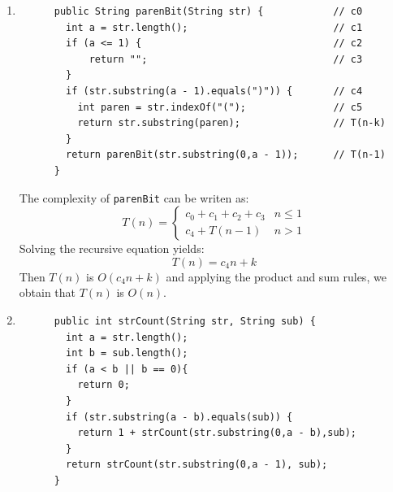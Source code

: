 \documentclass[a4paper,12pt]{article}
\begin{document}
\begin{enumerate}
      \item \begin{Verbatim}
      public String parenBit(String str) {            // c0
        int a = str.length();                         // c1
        if (a <= 1) {                                 // c2
            return "";                                // c3
        }
        if (str.substring(a - 1).equals(")")) {       // c4
          int paren = str.indexOf("(");               // c5
          return str.substring(paren);                // T(n-k)
        }
        return parenBit(str.substring(0,a - 1));      // T(n-1)
      }
      \end{Verbatim}
      The complexity of \texttt{parenBit} can be writen as:
      \begin{equation*}
        T\left( n \right)=\left\{\begin{array}{cc} c_{0}+c_{1}+c_{2}+c_{3} & n\leq 1 \\ c_{4}+T\left( n-1 \right) & n>1\end{array}\right.
      \end{equation*}
      Solving the recursive equation yields:
      \begin{equation*}
        T(n)=c_4n+k
      \end{equation*}
      Then $T(n)$ is $O(c_4n+k)$ and applying the product and sum rules, we obtain that $T(n)$ is $O(n)$.
      \item \begin{Verbatim}
      public int strCount(String str, String sub) {
        int a = str.length();
        int b = sub.length();
        if (a < b || b == 0){
          return 0;
        }
        if (str.substring(a - b).equals(sub)) {
          return 1 + strCount(str.substring(0,a - b),sub);
        }
        return strCount(str.substring(0,a - 1), sub);
      }
      \end{Verbatim}
    \end{enumerate}
\end{document}
